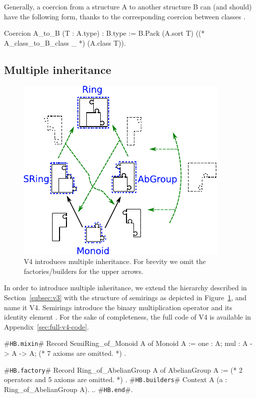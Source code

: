 \documentclass[a4paper,UKenglish,cleveref, autoref]{lipics-v2019}
\newcommand{\hbmixin}{{\tt\color{dkgreen}HB.mixin}}
\newcommand{\hbfactory}{{\tt\color{dkgreen}HB.factory}}
\newcommand{\hbbuilders}{{\tt\color{dkgreen}HB.builders}}
\newcommand{\hbend}{{\tt\color{dkgreen}HB.end}}
\theoremstyle{implem}
\theoremstyle{implem}
\theoremstyle{command}
\theoremstyle{commands}
\begin{document}
Generally, a coercion from a structure A to another structure B can (and should) have the following form, thanks to the corresponding coercion between classes .
\begin{coqcode}
Coercion A_to_B (T : A.type) : B.type :=
  B.Pack (A.sort T) ((* A_class_to_B_class _ *) (A.class T)).
\end{coqcode}

\subsection{Multiple inheritance}

\begin{figure}
 \includegraphics[width=.4\textwidth]{v4.pdf}
 \caption{V4 introduces multiple inheritance. For brevity we omit the factories/builders for the upper arrows.}
 \label{fig:puzzle_v4}
\end{figure}
In order to introduce multiple inheritance, we extend the hierarchy described in
Section~\ref{subsec:v3} with the structure of semirings %
as depicted in Figure~\ref{fig:puzzle_v4}, and name it V4. Semirings introduce the
binary multiplication operator  and its identity element
.  For the sake of completeness, the full code of V4 is available in
Appendix~\ref{sec:full-v4-code}.

\begin{coqcode}
#\hbmixin{}# Record SemiRing_of_Monoid A
  of Monoid A := {
  one : A;
  mul : A -> A -> A;
  (* 7 axioms are omitted. *)
}.

#\hbfactory{}# Record Ring_of_AbelianGroup A
  of AbelianGroup A := {
  (* 2 operators and 5 axioms are omitted. *)
}.
#\hbbuilders{}# Context A (a : Ring_of_AbelianGroup A).
..
#\hbend{}#.
\end{coqcode}
\end{document}
